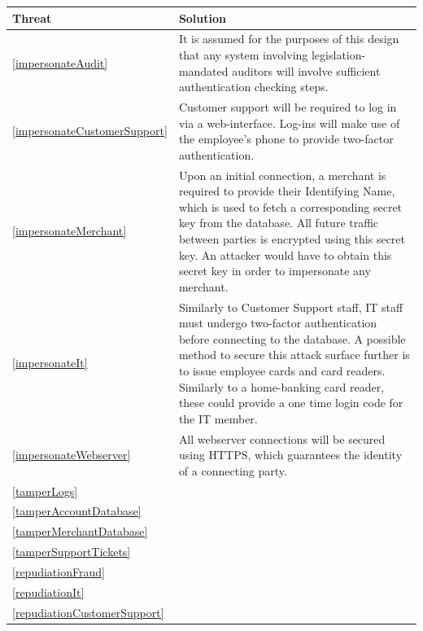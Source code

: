 \begin{center}\begin{tabular}{|| p{3em} | p{15em} ||}
    \hline
    Threat & Solution \\
    \hline\hline

              \ref{impersonateAudit} & 
        It is assumed for the purposes of this design that any system involving legislation-mandated auditors will involve sufficient authentication checking steps.
    \\ \hline \ref{impersonateCustomerSupport} & 
        Customer support will be required to log in via a web-interface. Log-ins will make use of the employee's phone to provide two-factor authentication.
    \\ \hline \ref{impersonateMerchant} &
        Upon an initial connection, a merchant is required to provide their Identifying Name, which is used to fetch a corresponding secret key from the database. All future traffic between parties is encrypted using this secret key. An attacker would have to obtain this secret key in order to impersonate any merchant.
    \\ \hline \ref{impersonateIt} &
        Similarly to Customer Support staff, IT staff must undergo two-factor authentication before connecting to the database. A possible method to secure this attack surface further is to issue employee cards and card readers. Similarly to a home-banking card reader, these could provide a one time login code for the IT member.
    \\ \hline \ref{impersonateWebserver} &
        All webserver connections will be secured using HTTPS, which guarantees the identity of a connecting party.
    \\ \hline \ref{tamperLogs} &
        
    \\ \hline \ref{tamperAccountDatabase} &
        
    \\ \hline \ref{tamperMerchantDatabase} &
        
    \\ \hline \ref{tamperSupportTickets} &
        
    \\ \hline \ref{repudiationFraud} &
        
    \\ \hline \ref{repudiationIt} &
        
    \\ \hline \ref{repudiationCustomerSupport} &
        

\end{tabular}
\end{center}

